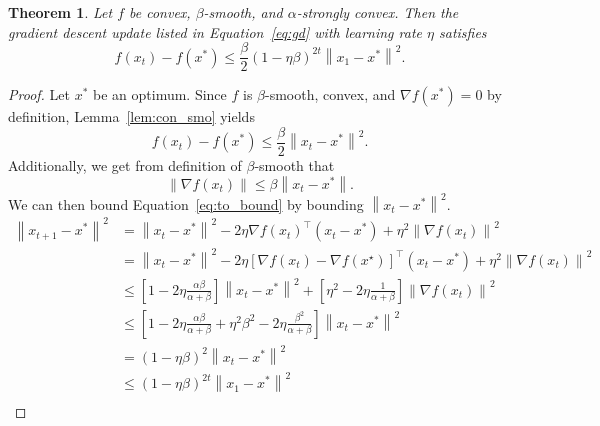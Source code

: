 \documentclass{article}
\newcommand{\norm}[1]{\left\| #1 \right\| }
\newtheorem{theorem}{Theorem}
\theoremstyle{definition}
\begin{document}
\begin{theorem}
    Let $f$ be convex, $\beta$-smooth, and $\alpha$-strongly convex. Then the
    gradient descent update listed in Equation~\ref{eq:gd} with learning rate
    $\eta$ satisfies
    \begin{equation}
        f(x_t) - f(x^*) \leq \frac{\beta}{2} {\left( 1 - \eta \beta
        \right)}^{2t} \norm{x_1 - x^*}^2.
    \end{equation}
\end{theorem}

\begin{proof}
    Let $x^*$ be an optimum. Since $f$ is $\beta$-smooth, convex, and
    $\nabla f(x^*) = 0$ by definition, Lemma~\ref{lem:con_smo} yields
    \begin{equation}
        \label{eq:to_bound}
        f(x_t) - f(x^*) \leq \frac{\beta}{2} \norm{x_t - x^*}^2.
    \end{equation}
    Additionally, we get from definition of $\beta$-smooth that 
    \begin{equation}
        \norm{\nabla f(x_t)} \leq \beta \norm{x_t - x^*}.
    \end{equation}
    We can then bound Equation~\ref{eq:to_bound} by bounding $\norm{x_t - x^*}^2$.
    \begin{equation}
        \begin{aligned}
            \norm{x_{t + 1} - x^*}^2 &= \norm{x_t - x^*}^2 - 2\eta {\nabla
            f(x_t)}^\intercal (x_t - x^*) + \eta^2 \norm{\nabla f(x_t)}^2 \\
            &= \norm{x_t - x^*}^2 - 2\eta {[\nabla
            f(x_t) - \nabla f(x^\star)]}^\intercal (x_t - x^*) + \eta^2
            \norm{\nabla f(x_t)}^2 \\
            &\leq \left[ 1 - 2\eta \frac{\alpha \beta}{\alpha + \beta}
            \right]\norm{x_t - x^*}^2 + \left[  \eta^2  - 2\eta\frac{1}{\alpha +
            \beta} \right]\norm{\nabla f(x_t)}^2\\
            &\leq \left[ 1 - 2\eta \frac{\alpha \beta}{\alpha + \beta}
              + \eta^2\beta^2  - 2\eta\frac{\beta^2}{\alpha +
            \beta} \right]\norm{x_t - x^*}^2 \\
            &= {\left( 1 -  \eta\beta  \right)}^2\norm{x_t - x^*}^2 \\
            &\leq {\left( 1 -  \eta\beta  \right)}^{2t}\norm{x_1 - x^*}^2 \\
        \end{aligned}
    \end{equation}
\end{proof}





\end{document}
